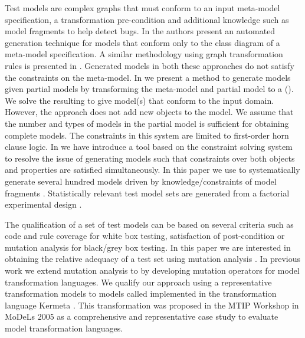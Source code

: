   Test models are complex graphs that must conform to an input meta-model specification, a transformation pre-condition and additional knowledge such as model fragments to help detect bugs. In \cite{brottier2006} the authors present an automated generation technique for models that conform only to the class diagram of a meta-model specification. A similar methodology using graph transformation rules is presented in \cite{ehrig2006}. Generated models in both these approaches do not satisfy the constraints on the meta-model. In \cite{sen2007} we present a method to generate models given partial models by transforming the meta-model and partial model to a {\textCLP} ({\CLP}). We solve the resulting {\CLP} to give model(s) that conform to the input domain. However, the approach does not add new objects to the model. We assume that the number and types of models in the partial model is sufficient for obtaining complete models. The constraints in this system are limited to first-order horn clause logic.  In \cite{sen2008} we have introduce a tool {\Cartier} based on the constraint solving system {\Alloy} to resolve the issue of generating models such that constraints over both objects and properties are satisfied simultaneously. In this paper we use {\Cartier} to systematically generate several hundred models driven by knowledge/constraints of model fragments \cite{franck2007}. Statistically relevant test model sets are generated from a factorial experimental design \cite{shari2005} \cite{walter1955}.%

The qualification of a set of test models can be based on several criteria such as code and rule coverage for white box testing, satisfaction of post-condition or mutation analysis for black/grey box testing. In this paper we are interested in obtaining the relative adequacy of a test set using mutation analysis \cite{demillo1978}. In previous work \cite{mottu2006} we extend mutation analysis to {\MDE} by developing mutation operators for model transformation languages. We qualify our approach using a representative transformation {\UMLCD} models to {\RDBMS} models called {\transfo} implemented in the transformation language Kermeta \cite{muller2005}. This transformation \cite{bezivin2005} was proposed in the MTIP Workshop in MoDeLs 2005 as a comprehensive and representative case study to evaluate model transformation languages.
